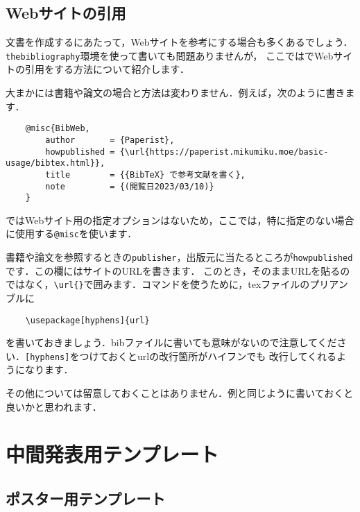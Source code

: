 \documentclass[a4paper,11pt]{jsreport}
\numberwithin{equation}{section}
\theoremstyle{definition}
\begin{document}
\section{Webサイトの引用}

文書を作成するにあたって，Webサイトを参考にする場合も多くあるでしょう．\verb|thebibliography|環境を使って書いても問題ありませんが，
ここでは{\BibTeX}でWebサイトの引用をする方法について紹介します．

大まかには書籍や論文の場合と方法は変わりません．例えば，次のように書きます\cite{BibWeb}．
\begin{verbatim}
    @misc{BibWeb,
        author       = {Paperist},
        howpublished = {\url{https://paperist.mikumiku.moe/basic-usage/bibtex.html}},
        title        = {{BibTeX} で参考文献を書く},
        note         = {(閲覧日2023/03/10)}
    }
\end{verbatim}

{\BibTeX}ではWebサイト用の指定オプションはないため，ここでは，特に指定のない場合に使用する\verb|@misc|を使います．

書籍や論文を参照するときの\verb|publisher|，出版元に当たるところが\verb|howpublished|です．この欄にはサイトのURLを書きます．
このとき，そのままURLを貼るのではなく，\verb|\url{}|で囲みます．コマンドを使うために，texファイルのプリアンブルに
\begin{verbatim}
    \usepackage[hyphens]{url}
\end{verbatim}
を書いておきましょう．bibファイルに書いても意味がないので注意してください．\verb|[hyphens]|をつけておくとurlの改行箇所がハイフンでも
改行してくれるようになります．

その他については留意しておくことはありません．例と同じように書いておくと良いかと思われます．


\chapter{中間発表用テンプレート}


\section{ポスター用テンプレート}
\end{document}
